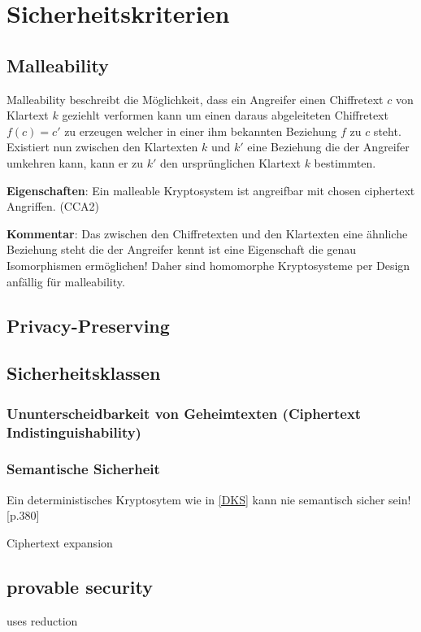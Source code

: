 \chapter{Sicherheitskriterien}
\label{SK}
\section{Malleability} \label{malleability}
Malleability beschreibt die Möglichkeit, dass ein Angreifer einen Chiffretext $c$ von Klartext $k$ geziehlt verformen kann um einen daraus abgeleiteten Chiffretext $f(c)=c'$ zu erzeugen welcher in einer ihm bekannten Beziehung $f$ zu $c$ steht. Existiert nun zwischen den Klartexten $k$ und $k'$ eine Beziehung die der Angreifer umkehren kann, kann er zu $k'$ den ursprünglichen Klartext $k$ bestimmten. \cite[p. 292]{smart2003}

\textbf{Eigenschaften}: Ein malleable Kryptosystem ist angreifbar mit chosen ciphertext Angriffen. (CCA2)

\textbf{Kommentar}: Das zwischen den Chiffretexten und den Klartexten eine ähnliche Beziehung steht die der Angreifer kennt ist eine Eigenschaft die genau Isomorphismen ermöglichen! Daher sind homomorphe Kryptosysteme per Design anfällig für malleability.

\section{Privacy-Preserving}

\section{Sicherheitsklassen}
\label{Sicherheitsklassen}
\subsection {Ununterscheidbarkeit von Geheimtexten (Ciphertext Indistinguishability)}
\subsection{Semantische Sicherheit}
Ein deterministisches Kryptosytem wie in \ref{DKS} kann nie semantisch sicher sein! [p.380]\cite{katz2014introduction}



Ciphertext expansion

\section{provable security}
uses reduction

